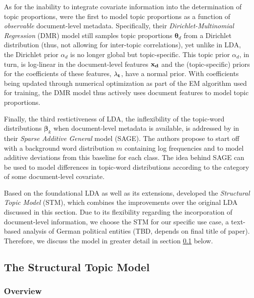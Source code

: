 As for the inability to integrate covariate information into the determination of topic proportions, \cite{mimno2011optimizing} were the first to model topic proportions as a function of \textit{observable} document-level metadata. Specifically, their \textit{Dirichlet-Multinomial Regression} (DMR) model still samples topic proportions $\boldsymbol{\theta}_d$ from a Dirichlet distribution (thus, not allowing for inter-topic correlations), yet unlike in LDA, the Dirichlet prior $\alpha_d$ is no longer global but topic-specific. This topic prior $\alpha_d$, in turn, is log-linear in the document-level features $\bf{x_d}$ and the (topic-specific) priors for the coefficients of these features, $\bf{\lambda_t}$, have a normal prior. With coefficients being updated through numerical optimization as part of the EM algorithm used for training, the DMR model thus actively uses document features to model topic proportions. 

Finally, the third restictiveness of LDA, the inflexibility of the topic-word distributions $\boldsymbol{\beta}_k$ when document-level metadata is available, is addressed by \cite{eisenstein2011sparse} in their \textit{Sparse Additive General} model (SAGE). The authors propose to start off with a background word distribution $m$ containing log frequencies and to model additive deviations from this baseline for each class. The idea behind SAGE can be used to model differences in topic-word distributions according to the category of some document-level covariate.

Based on the foundational LDA as well as its extensions, \cite{roberts2013structural} developed the \textit{Structural Topic Model} (STM), which combines the improvements over the original LDA discussed in this section. Due to its flexibility regarding the incorporation of document-level information, we choose the STM for our specific use case, a text-based analysis of German political entities (TBD, depends on final title of paper). Therefore, we discuss the model in greater detail in section \ref{The Structural Topic Model} below.

\subsection{The Structural Topic Model}
\label{The Structural Topic Model}

\subsubsection*{Overview}

